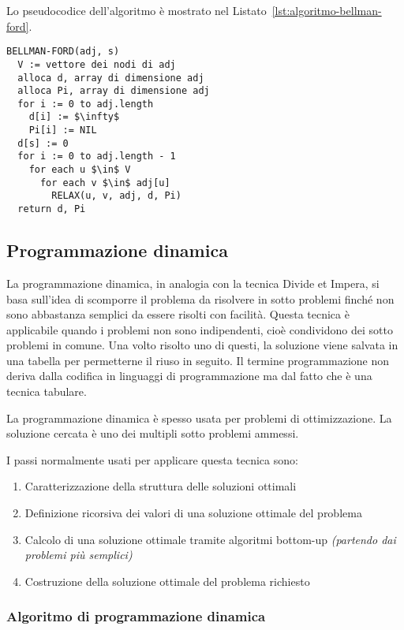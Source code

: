 \documentclass[italian, 10pt]{article}
\begin{document}
\bigskip
Lo pseudocodice dell'algoritmo è mostrato nel Listato~\ref{lst:algoritmo-bellman-ford}.

\begin{lstlisting}[style=pseudocode, caption={Algoritmo di Bellman-Ford}, label={lst:algoritmo-bellman-ford}]
BELLMAN-FORD(adj, s)
  V := vettore dei nodi di adj
  alloca d, array di dimensione adj
  alloca Pi, array di dimensione adj
  for i := 0 to adj.length
    d[i] := $\infty$
    Pi[i] := NIL
  d[s] := 0
  for i := 0 to adj.length - 1
    for each u $\in$ V
      for each v $\in$ adj[u]
        RELAX(u, v, adj, d, Pi)
  return d, Pi
\end{lstlisting}

\subsection{Programmazione dinamica}

La programmazione dinamica, in analogia con la tecnica Divide et Impera, si basa sull'idea di scomporre il problema da risolvere in sotto problemi finché non sono abbastanza semplici da essere risolti con facilità.
Questa tecnica è applicabile quando i problemi non sono indipendenti, cioè condividono dei sotto problemi in comune.
Una volto risolto uno di questi, la soluzione viene salvata in una tabella per permetterne il riuso in seguito.
Il termine programmazione non deriva dalla codifica in linguaggi di programmazione ma dal fatto che è una tecnica tabulare.

La programmazione dinamica è spesso usata per problemi di ottimizzazione.
La soluzione cercata è uno dei multipli sotto problemi ammessi.

\bigskip
I passi normalmente usati per applicare questa tecnica sono:

\begin{enumerate}
  \item Caratterizzazione della struttura delle soluzioni ottimali
  \item Definizione ricorsiva dei valori di una soluzione ottimale del problema
  \item Calcolo di una soluzione ottimale tramite algoritmi bottom-up \textit{(partendo dai problemi più semplici)}
  \item Costruzione della soluzione ottimale del problema richiesto
\end{enumerate}

\subsubsection{Algoritmo di programmazione dinamica}
\end{document}
